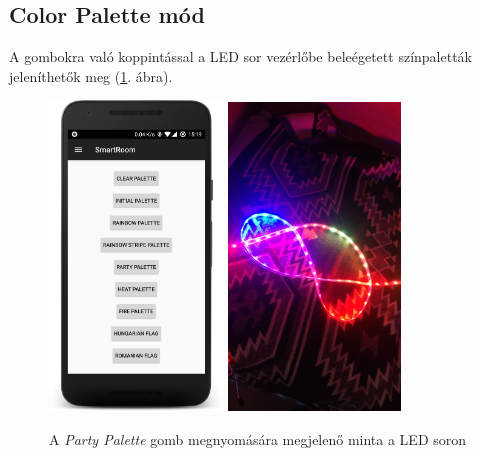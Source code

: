 \documentclass[../main.tex]{subfiles}
\begin{document}
        \subsection{Color Palette mód}
            A gombokra való koppintással a LED sor vezérlőbe beleégetett színpaletták jeleníthetők meg (\ref{fig:color_palettes}. ábra).
            \begin{figure}[h!]
                \centering
                    \includegraphics[width=4.6cm]{android_res/screen_pictures/color_palette_01}
                    \includegraphics[width=4.6cm]{android_res/color_palette_11}
                \caption{A \textit{Party Palette} gomb megnyomására megjelenő minta a LED soron}
                \label{fig:color_palettes}
            \end{figure}
        
\end{document}
